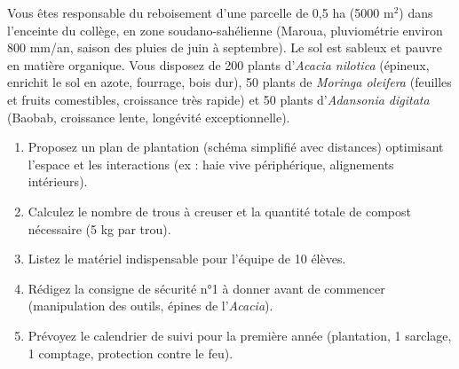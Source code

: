 \documentclass[11pt]{article}
\begin{document}
\begin{exercice}
Vous êtes responsable du reboisement d'une parcelle de 0,5 ha (5000 m$^2$) dans l'enceinte du collège, en zone soudano-sahélienne (Maroua, pluviométrie environ 800 mm/an, saison des pluies de juin à septembre). Le sol est sableux et pauvre en matière organique. Vous disposez de 200 plants d'\textit{Acacia nilotica} (épineux, enrichit le sol en azote, fourrage, bois dur), 50 plants de \textit{Moringa oleifera} (feuilles et fruits comestibles, croissance très rapide) et 50 plants d'\textit{Adansonia digitata} (Baobab, croissance lente, longévité exceptionnelle).
\begin{enumerate}
    \item Proposez un plan de plantation (schéma simplifié avec distances) optimisant l'espace et les interactions (ex : haie vive périphérique, alignements intérieurs).
    \item Calculez le nombre de trous à creuser et la quantité totale de compost nécessaire (5 kg par trou).
    \item Listez le matériel indispensable pour l'équipe de 10 élèves.
    \item Rédigez la consigne de sécurité n°1 à donner avant de commencer (manipulation des outils, épines de l'\textit{Acacia}).
    \item Prévoyez le calendrier de suivi pour la première année (plantation, 1 sarclage, 1 comptage, protection contre le feu).
\end{enumerate}
\end{exercice}
\end{document}
